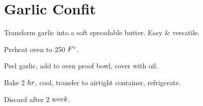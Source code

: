 \section{Garlic Confit}


\begin{recipestats}[
	servings=4~\fluidounce,
	preptime=5~\minute,
	bakingtime=2~\hour,
	original=\citeauthor{bonAppetitGarlic}~\cite{bonAppetitGarlic},
]
\end{recipestats}


\begin{recipeabstract}
	Transform garlic into a soft spreadable butter.
	Easy \& versatile.
\end{recipeabstract}


\begin{ingredientcolumns}
	\begin{ingredientblock}
	\end{ingredientblock}
	\begin{ingredientblock}
		\ingredient[\approx\onehalf][C]{olive oil}
	\end{ingredientblock}
\end{ingredientcolumns}


\begin{preparation}
\item Preheat oven to 250 $\Fahrenheit$.
\item Peel garlic, add to oven proof bowl, cover with oil.
\item Bake 2 $\hour$, cool, transfer to airtight container, refrigerate.
\item Discard after 2 $\week$.
\end{preparation}


\recipeend%
